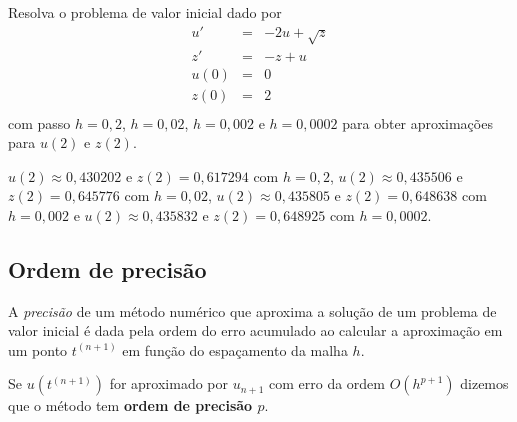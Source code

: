 \begin{exer}Resolva o problema de valor inicial dado por
\begin{eqnarray*}
u'&=& -2u + \sqrt{z}\\
z'&=& -z + u\\
u(0)&=&0\\
z(0)&=&2\\
\end{eqnarray*}
com passo $h=0,2$, $h=0,02$, $h=0,002$ e $h=0,0002$ para obter aproximações para $u(2)$ e $z(2)$.
\end{exer}
\begin{resp}

$u(2)\approx 0,430202$ e $z(2)=0,617294$ com $h=0,2$,
$u(2)\approx 0,435506$ e $z(2)=0,645776$ com $h=0,02$,
$u(2)\approx 0,435805$ e $z(2)=0,648638$ com $h=0,002$ e
$u(2)\approx 0,435832$ e $z(2)=0,648925$ com $h=0,0002$.

\end{resp}


\subsection{Ordem de precisão}




A \emph{precisão} de um método numérico que aproxima a solução de um problema de valor inicial é dada pela ordem do erro acumulado ao calcular a aproximação em um ponto $t^{(n+1)}$ em função do espaçamento da malha $h$.

Se $u(t^{(n+1)})$ for aproximado por $u_{n+1}$ com erro da ordem $O(h^{p+1})$ dizemos que o método tem \textbf{ordem de precisão $p$}.


